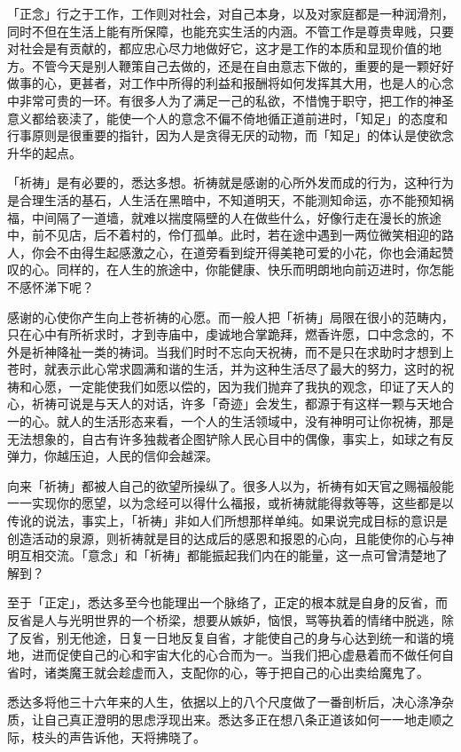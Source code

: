 \documentclass[twoside,openany]{book}
\begin{document}
「正念」行之于工作，工作则对社会，对自己本身，以及对家庭都是一种润滑剂，同时不但在生活上能有所保障，也能充实生活的内涵。不管工作是尊贵卑贱，只要对社会是有贡献的，都应忠心尽力地做好它，这才是工作的本质和显现价值的地方。不管今天是别人鞭策自己去做的，还是在自由意志下做的，重要的是一颗好好做事的心，更甚者，对工作中所得的利益和报酬将如何发挥其大用，也是人的心念中非常可贵的一环。有很多人为了满足一己的私欲，不惜愧于职守，把工作的神圣意义都给亵渎了，能使一个人的意念不偏不倚地循正道前进时，「知足」的态度和行事原则是很重要的指针，因为人是贪得无厌的动物，而「知足」的体认是使欲念升华的起点。

「祈祷」是有必要的，悉达多想。祈祷就是感谢的心所外发而成的行为，这种行为是合理生活的基石，人生活在黑暗中，不知道明天，不能测知命运，亦不能预知祸福，中间隔了一道墙，就难以揣度隔壁的人在做些什么，好像行走在漫长的旅途中，前不见店，后不着村的，伶仃孤单。此时，若在途中遇到一两位微笑相迎的路人，你会不由得生起感激之心，在道旁看到绽开得美艳可爱的小花，你也会涌起赞叹的心。同样的，在人生的旅途中，你能健康、快乐而明朗地向前迈进时，你怎能不感怀涕下呢？

感谢的心使你产生向上苍祈祷的心愿。而一般人把「祈祷」局限在很小的范畴内，只在心中有所祈求时，才到寺庙中，虔诚地合掌跪拜，燃香许愿，口中念念的，不外是祈神降祉一类的祷词。当我们时时不忘向天祝祷，而不是只在求助时才想到上苍时，就表示此心常求圆满和谐的生活，并为这种生活尽了最大的努力，这时的祝祷和心愿，一定能使我们如愿以偿的，因为我们抛弃了我执的观念，印证了天人的心，祈祷可说是与天人的对话，许多「奇迹」会发生，都源于有这样一颗与天地合一的心。就人的生活形态来看，一个人的生活领域中，没有神明可让你祝祷，那是无法想象的，自古有许多独裁者企图铲除人民心目中的偶像，事实上，如球之有反弹力，你越压迫，人民的信仰会越深。

向来「祈祷」都被人自己的欲望所操纵了。很多人以为，祈祷有如天官之赐福般能一一实现你的愿望，以为念经可以得什么福报，或祈祷就能得救等等，这些都是以传讹的说法，事实上，「祈祷」非如人们所想那样单纯。如果说完成目标的意识是创造活动的泉源，则祈祷就是目的达成后的感恩和报恩的心向，且能使你的心与神明互相交流。「意念」和「祈祷」都能振起我们内在的能量，这一点可曾清楚地了解到？

至于「正定」，悉达多至今也能理出一个脉络了，正定的根本就是自身的反省，而反省是人与光明世界的一个桥梁，想要从嫉妒，恼恨，骂等执着的情绪中脱逃，除了反省，别无他途，日复一日地反复自省，才能使自己的身与心达到统一和谐的境地，进而促使自己的心和宇宙大化的心合而为一。当我们把心虚悬着而不做任何自省时，诸类魔王就会趁虚而入，支配你的心，等于把自己的心出卖给魔鬼了。

悉达多将他三十六年来的人生，依据以上的八个尺度做了一番剖析后，决心涤净杂质，让自己真正澄明的思虑浮现出来。悉达多正在想八条正道该如何一一地走顺之际，枝头的声告诉他，天将拂晓了。
\end{document}
